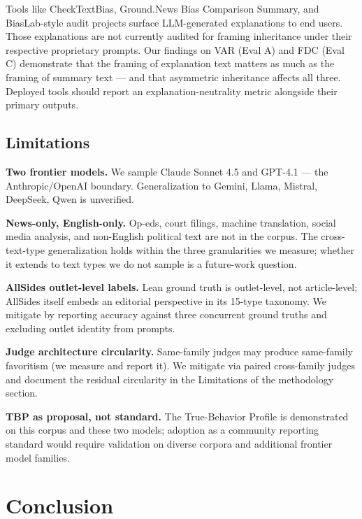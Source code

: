 \documentclass{article}
\begin{document}
Tools like CheckTextBias, Ground.News Bias Comparison Summary, and BiasLab-style audit projects surface LLM-generated explanations to end users. Those explanations are not currently audited for framing inheritance under their respective proprietary prompts. Our findings on VAR (Eval A) and FDC (Eval C) demonstrate that the framing of explanation text matters as much as the framing of summary text — and that asymmetric inheritance affects all three. Deployed tools should report an explanation-neutrality metric alongside their primary outputs.

\subsection{Limitations}

\textbf{Two frontier models.} We sample Claude Sonnet 4.5 and GPT-4.1 — the Anthropic/OpenAI boundary. Generalization to Gemini, Llama, Mistral, DeepSeek, Qwen is unverified.

\textbf{News-only, English-only.} Op-eds, court filings, machine translation, social media analysis, and non-English political text are not in the corpus. The cross-text-type generalization holds within the three granularities we measure; whether it extends to text types we do not sample is a future-work question.

\textbf{AllSides outlet-level labels.} Lean ground truth is outlet-level, not article-level; AllSides itself embeds an editorial perspective in its 15-type taxonomy. We mitigate by reporting accuracy against three concurrent ground truths and excluding outlet identity from prompts.

\textbf{Judge architecture circularity.} Same-family judges may produce same-family favoritism (we measure and report it). We mitigate via paired cross-family judges and document the residual circularity in the Limitations of the methodology section.

\textbf{TBP as proposal, not standard.} The True-Behavior Profile is demonstrated on this corpus and these two models; adoption as a community reporting standard would require validation on diverse corpora and additional frontier model families.

\section{Conclusion}
\end{document}
